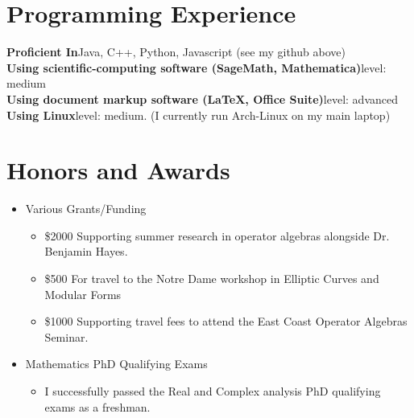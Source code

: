 \documentclass[12pt,letterpaper,sans]{moderncv}
\begin{document}
\section{Programming Experience}
\textbf{Proficient In}\quad Java, C++, Python, Javascript (see my github above) \\
\textbf{Using scientific-computing software (SageMath, Mathematica)}\quad level: medium \\
\textbf{Using document markup software (\LaTeX, Office Suite)}\quad level: advanced \\
\textbf{Using Linux}\quad level: medium. (I currently run Arch-Linux on my main laptop)

\section{Honors and Awards}
\begin{itemize}
  \item Various Grants/Funding 
  \begin{itemize}
    \item \$2000 Supporting summer research in operator algebras alongside Dr. Benjamin Hayes.
    \item \$500 For travel to the Notre Dame workshop in Elliptic Curves and Modular Forms
    \item \$1000 Supporting travel fees to attend the East Coast Operator Algebras Seminar. 
  \end{itemize}
  \item Mathematics PhD Qualifying Exams
  \begin{itemize}
    \item I successfully passed the Real and Complex analysis PhD qualifying exams as a freshman.
  \end{itemize}



  
\end{itemize}
\end{document}
